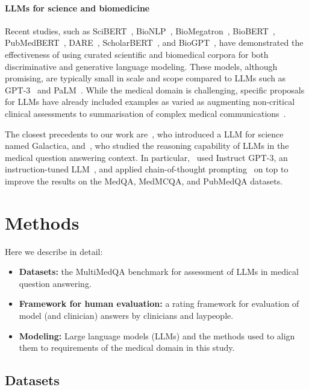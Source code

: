 \documentclass[10pt, letter, onecolumn]{arxiv}
\begin{document}
\begin{refsection}
\paragraph{LLMs for science and biomedicine}  Recent studies, such as SciBERT~\cite{beltagy2019scibert}, BioNLP~\cite{lewis2020pretrained}, BioMegatron~\cite{shin2020biomegatron}, BioBERT~\cite{lee2020biobert}, PubMedBERT~\cite{gu2021domain}, DARE~\cite{papanikolaou2020dare}, ScholarBERT~\cite{hong2022scholarbert}, and BioGPT~\cite{luo2022biogpt}, have demonstrated the effectiveness of using curated scientific and biomedical corpora for both discriminative and generative language modeling. These models, although promising, are typically small in scale and scope compared to LLMs such as GPT-3~\cite{brown2020language} and PaLM~\cite{chowdhery2022palm}. While the medical domain is challenging, specific proposals for LLMs have already included examples as varied as augmenting non-critical clinical assessments to summarisation of complex medical communications~\cite{korngiebel2021considering, sezgin2022operationalizing, agrawal2022large}.

The closest precedents to our work are~\citet{taylor2022galactica}, who introduced a LLM for science named Galactica, and~\citet{lievin2022can}, who studied the reasoning capability of LLMs in the medical question answering context. In particular,~\citet{lievin2022can} used Instruct GPT-3, an instruction-tuned LLM~\cite{ouyang2022training}, and applied chain-of-thought prompting~\cite{wei2022chain} on top to improve the results on the MedQA, MedMCQA, and PubMedQA datasets.


\section{Methods}
Here we describe in detail: 
\begin{itemize}
    \item \textbf{Datasets:} the MultiMedQA benchmark for assessment of LLMs in medical question answering.
    \item \textbf{Framework for human evaluation:} a rating framework for evaluation of model (and clinician) answers by clinicians and laypeople.
    \item \textbf{Modeling:} Large language models (LLMs) and the methods used to align them to requirements of the medical domain in this study.
\end{itemize}

\subsection{Datasets}
\label{sec:datasets}


\end{refsection}
\end{document}
